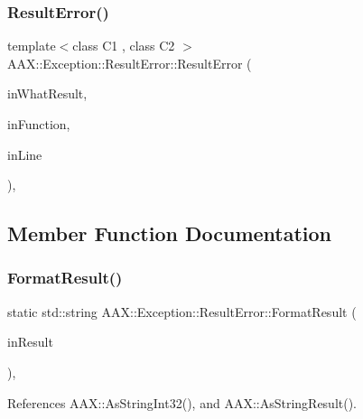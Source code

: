 \subsubsection{\texorpdfstring{ResultError()}{ResultError()}\hspace{0.1cm}{\footnotesize\ttfamily [3/3]}}
{\footnotesize\ttfamily template$<$class C1 , class C2 $>$ \\
A\+A\+X\+::\+Exception\+::\+Result\+Error\+::\+Result\+Error (\begin{DoxyParamCaption}\item[{\mbox{\hyperlink{a00392_a4d8f69a697df7f70c3a8e9b8ee130d2f}{A\+A\+X\+\_\+\+Result}}}]{in\+What\+Result,  }\item[{const C1 \&}]{in\+Function,  }\item[{const C2 \&}]{in\+Line }\end{DoxyParamCaption})\hspace{0.3cm}{\ttfamily [inline]}, {\ttfamily [explicit]}}



\subsection{Member Function Documentation}
\mbox{\label{a01597_a55c2ce6a7122bee29558dc16bd860067}} 
\subsubsection{\texorpdfstring{FormatResult()}{FormatResult()}}
{\footnotesize\ttfamily static std\+::string A\+A\+X\+::\+Exception\+::\+Result\+Error\+::\+Format\+Result (\begin{DoxyParamCaption}\item[{\mbox{\hyperlink{a00392_a4d8f69a697df7f70c3a8e9b8ee130d2f}{A\+A\+X\+\_\+\+Result}}}]{in\+Result }\end{DoxyParamCaption})\hspace{0.3cm}{\ttfamily [inline]}, {\ttfamily [static]}}



References A\+A\+X\+::\+As\+String\+Int32(), and A\+A\+X\+::\+As\+String\+Result().

